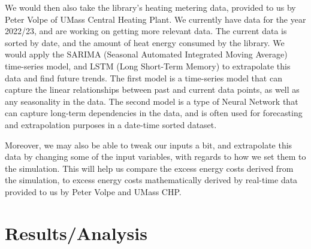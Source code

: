 \documentclass[conference,letterpaper]{IEEEtran}
\begin{document}
We would then also take the library's heating metering data, provided to us by Peter Volpe of UMass Central Heating Plant. We currently have data for the year 2022/23, and are working on getting more relevant data. The current data is sorted by date, and the amount of heat energy consumed by the library. We would apply the SARIMA (Seasonal Automated Integrated Moving Average) time-series model, and LSTM (Long Short-Term Memory) to extrapolate this data and find future trends. The first model is a time-series model that can capture the linear relationships between past and current data points, as well as any seasonality in the data. The second model is a type of Neural Network that can capture long-term dependencies in the data, and is often used for forecasting and extrapolation purposes in a date-time sorted dataset. 

Moreover, we may also be able to tweak our inputs a bit, and extrapolate this data by changing some of the input variables, with regards to how we set them to the simulation. This will help us compare the excess energy costs derived from the simulation, to excess energy costs mathematically derived by real-time data provided to us by Peter Volpe and UMass CHP.

\section{Results/Analysis}
\label{sec:Results}
\end{document}
